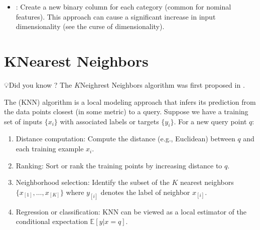 \documentclass[letterpaper,10pt,english]{jupyterBook}
\begin{document}
\begin{itemize}
\begin{itemize}
\item {} 
\sphinxAtStartPar
{}: Create a new binary column for each category (common for nominal features). This approach can cause a significant increase in input dimensionality (see the curse of dimensionality).

\end{itemize}

\end{itemize}


\section{K\sphinxhyphen{}Nearest Neighbors}
\label{\detokenize{03:k-nearest-neighbors}}
\begin{sphinxShadowBox}
\sphinxstylesidebartitle{}

\sphinxAtStartPar
💡Did you know ? The \(K\)\sphinxhyphen{}Neighrest Neighbors algorithm was first proposed in .
\end{sphinxShadowBox}

\sphinxAtStartPar
The  (KNN) algorithm is a local modeling approach that infers its prediction from the data points closest (in some metric) to a query. Suppose we have a training set of inputs \(\{x_i\}\) with associated labels or targets \(\{y_i\}\). For a new query point \(q\):
\begin{enumerate}
%
\item {} 
\sphinxAtStartPar
Distance computation: Compute the distance (e.g., Euclidean) between \(q\) and each training example \(x_i\).

\item {} 
\sphinxAtStartPar
Ranking: Sort or rank the training points by increasing distance to \(q\).

\item {} 
\sphinxAtStartPar
Neighborhood selection: Identify the subset of the \(K\) nearest neighbors \(\{x_{[1]}, \dots, x_{[K]}\}\) where \(y_{[i]}\) denotes the label of neighbor \(x_{[i]}\).

\item {} 
\sphinxAtStartPar
Regression or classification: KNN can be viewed as a local estimator of the conditional expectation \(\mathbb{E}[y|x=q]\).

\end{enumerate}
\end{document}
